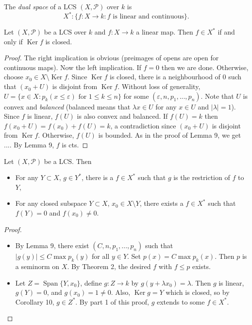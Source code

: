 The \emph{dual space} of a LCS $(X,\mathcal{P})$ over $k$ is
$$X^*:\{f:X\to k:\text{$f$ is linear and continuous}\}.$$

\begin{corollary}
  Let $(X,\mathcal{P})$ be a LCS over $k$ and $f:X\to k$ a linear map.
  Then $f\in X^*$ if and only if $\operatorname{Ker} f$ is closed.
\end{corollary}

\begin{proof}
  The right implication is obvious (preimages of opens are open for continuous maps).
  Now the left implication. If $f=0$ then we are done. Otherwise,
  choose $x_0\in X\setminus \operatorname{Ker}f$. Since $\operatorname{Ker}f$ is closed,
  there is a neighbourhood of $0$ such that $(x_0+U)$ is disjoint from  $\operatorname{Ker}f$.
  Without loss of generality,
  $U=\{x\in X:\text{$p_k(x\leq \varepsilon)$ for $1\leq k\leq n$}\}$
  for some $(\varepsilon,n,p_1,...,p_n)$.
  Note that $U$ is convex and \emph{balanced}
  (balanced means that $\lambda x\in U$ for any $x\in U$ and $|\lambda|=1$).
  Since $f$ is linear, $f(U)$ is also convex and balanced.
  If $f(U)=k$
  then $f(x_0+U)=f(x_0)+f(U)=k$,
  a contradiction since $(x_0+U)$ is disjoint from $\operatorname{Ker}f$.
  Otherwise, $f(U)$ is bounded.
  As in the proof of Lemma 9, we get ....
  By Lemma 9, $f$ is cts.
\end{proof}

\begin{theorem}
  Let $(X,\mathcal{P})$ be a LCS.
  Then
  \begin{itemize}
    \item For any $Y\subset X$, $g\in Y^*$, there is a $f\in X^*$ such that
    $g$ is the restriction of $f$ to $Y$,
    \item For any closed subspace $Y\subset X$, $x_0\in X\setminus Y$,
    there exists a $f\in X^*$ such that $f(Y)=0$ and $f(x_0)\neq 0$.
  \end{itemize}
\end{theorem}

\begin{proof}
\begin{itemize}
  \item By Lemma 9, there exist $(C,n,p_1,...,p_n)$ such that
  $|g(y)|\leq C\max p_k(y)$ for all $y\in Y$.
  Set $p(x)=C\max p_k(x)$. Then $p$ is a seminorm on $X$.
  By Theorem 2, the desired $f$ with $f\leq p$ exists.
  \item Let $Z=\operatorname{Span}\{Y,x_0\}$, define $g:Z\to k$
  by $g(y+\lambda x_0)=\lambda$.
  Then $g$ is linear, $g(Y)=0$, and $g(x_0)=1\neq 0$.
  Also, $\operatorname{Ker} g=Y$ which is closed, so by Corollary 10,
  $g\in Z^*$.
  By part 1 of this proof, $g$ extends to some $f\in X^*$.
\end{itemize}
\end{proof}

